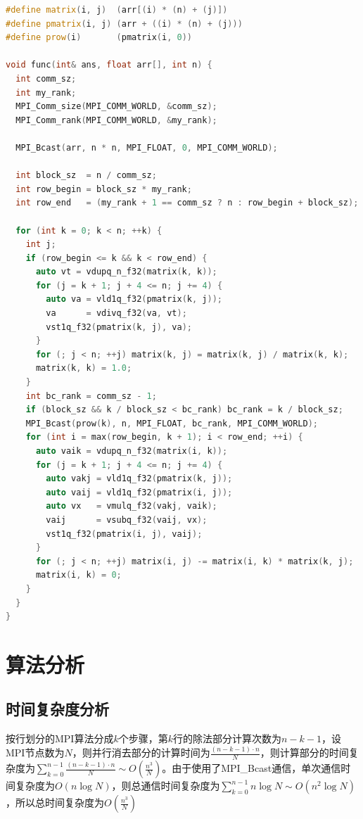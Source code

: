 \documentclass[a4paper]{article}
\begin{document}
\begin{lstlisting}[title=NEON优化,frame=trbl,language={C++}]
#define matrix(i, j)  (arr[(i) * (n) + (j)])
#define pmatrix(i, j) (arr + ((i) * (n) + (j)))
#define prow(i)       (pmatrix(i, 0))

void func(int& ans, float arr[], int n) {
  int comm_sz;
  int my_rank;
  MPI_Comm_size(MPI_COMM_WORLD, &comm_sz);
  MPI_Comm_rank(MPI_COMM_WORLD, &my_rank);

  MPI_Bcast(arr, n * n, MPI_FLOAT, 0, MPI_COMM_WORLD);

  int block_sz  = n / comm_sz;
  int row_begin = block_sz * my_rank;
  int row_end   = (my_rank + 1 == comm_sz ? n : row_begin + block_sz);

  for (int k = 0; k < n; ++k) {
    int j;
    if (row_begin <= k && k < row_end) {
      auto vt = vdupq_n_f32(matrix(k, k));
      for (j = k + 1; j + 4 <= n; j += 4) {
        auto va = vld1q_f32(pmatrix(k, j));
        va      = vdivq_f32(va, vt);
        vst1q_f32(pmatrix(k, j), va);
      }
      for (; j < n; ++j) matrix(k, j) = matrix(k, j) / matrix(k, k);
      matrix(k, k) = 1.0;
    }
    int bc_rank = comm_sz - 1;
    if (block_sz && k / block_sz < bc_rank) bc_rank = k / block_sz;
    MPI_Bcast(prow(k), n, MPI_FLOAT, bc_rank, MPI_COMM_WORLD);
    for (int i = max(row_begin, k + 1); i < row_end; ++i) {
      auto vaik = vdupq_n_f32(matrix(i, k));
      for (j = k + 1; j + 4 <= n; j += 4) {
        auto vakj = vld1q_f32(pmatrix(k, j));
        auto vaij = vld1q_f32(pmatrix(i, j));
        auto vx   = vmulq_f32(vakj, vaik);
        vaij      = vsubq_f32(vaij, vx);
        vst1q_f32(pmatrix(i, j), vaij);
      }
      for (; j < n; ++j) matrix(i, j) -= matrix(i, k) * matrix(k, j);
      matrix(i, k) = 0;
    }
  }
}
\end{lstlisting}

\section{算法分析}
\subsection{时间复杂度分析}
按行划分的MPI算法分成$k$个步骤，第$k$行的除法部分计算次数为$n-k-1$，设MPI节点数为$N$，则并行消去部分的计算时间为$\frac{(n-k-1) \cdot n}{N}$，则计算部分的时间复杂度为$\sum_{k=0}^{n-1}\frac{(n-k-1) \cdot n}{N} \sim O(\frac{n^3}{N})$。由于使用了MPI\_Bcast通信，单次通信时间复杂度为$O(n\log{N})$，则总通信时间复杂度为$\sum_{k=0}^{n-1}n\log{N} \sim O(n^2\log{N})$，所以总时间复杂度为$O(\frac{n^3}{N})$
\end{document}

